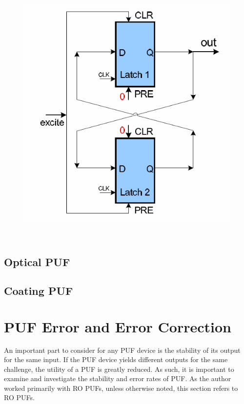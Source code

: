 \begin{figure}[h]
\includegraphics[width=500px]{images/butterflypuf.png}
\end{figure}

~\cite{butterflypuf}
\subsection{Optical PUF}

\subsection{Coating PUF}


\section{PUF Error and Error Correction}
An important part to consider for any PUF device is the stability of its output for
the same input. If the PUF device yields different outputs for the same challenge, the
utility of a PUF is greatly reduced. As such, it is important to examine and investigate
the stability and error rates of PUF. As the author worked primarily with RO PUFs, unless
otherwise noted, this section refers to RO PUFs.

